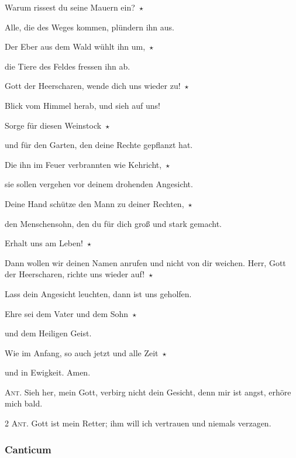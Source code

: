 \noindent Warum rissest du seine Mauern ein?~$\star$~\nopagebreak

Alle, die des Weges kommen, plündern ihn aus.

\noindent Der Eber aus dem Wald wühlt ihn um,~$\star$~\nopagebreak

die Tiere des Feldes fressen ihn ab.

\noindent Gott der Heerscharen, wende dich uns wieder zu!~$\star$~\nopagebreak

Blick vom Himmel herab, und sieh auf uns!

\noindent Sorge für diesen Weinstock~$\star$~\nopagebreak

und für den Garten, den deine Rechte gepflanzt hat.

\noindent Die ihn im Feuer verbrannten wie Kehricht,~$\star$~\nopagebreak

sie sollen vergehen vor deinem drohenden Angesicht.

\noindent Deine Hand schütze den Mann zu deiner Rechten,~$\star$~\nopagebreak

den Menschensohn, den du für dich groß und stark gemacht.

\noindent Erhalt uns am Leben!~$\star$~\nopagebreak

Dann wollen wir deinen Namen anrufen und nicht von dir weichen. Herr, Gott der Heerscharen, richte uns wieder auf!~$\star$~\nopagebreak

Lass dein Angesicht leuchten, dann ist uns geholfen.

\noindent Ehre sei dem Vater und dem Sohn~$\star$~\nopagebreak

und dem Heiligen Geist.

\noindent Wie im Anfang, so auch jetzt und alle Zeit~$\star$~\nopagebreak

und in Ewigkeit. Amen.

\vspace{10pt}

\noindent \textsc{Ant.} Sieh her, mein Gott, verbirg nicht dein Gesicht, denn mir ist angst, erhöre mich bald. 

\vspace{10pt}

\noindent \textsc{2 Ant.} Gott ist mein Retter; ihm will ich vertrauen und niemals verzagen. \nopagebreak

\subsubsection{Canticum}

